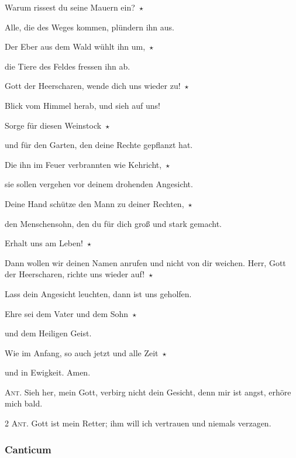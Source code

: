 \noindent Warum rissest du seine Mauern ein?~$\star$~\nopagebreak

Alle, die des Weges kommen, plündern ihn aus.

\noindent Der Eber aus dem Wald wühlt ihn um,~$\star$~\nopagebreak

die Tiere des Feldes fressen ihn ab.

\noindent Gott der Heerscharen, wende dich uns wieder zu!~$\star$~\nopagebreak

Blick vom Himmel herab, und sieh auf uns!

\noindent Sorge für diesen Weinstock~$\star$~\nopagebreak

und für den Garten, den deine Rechte gepflanzt hat.

\noindent Die ihn im Feuer verbrannten wie Kehricht,~$\star$~\nopagebreak

sie sollen vergehen vor deinem drohenden Angesicht.

\noindent Deine Hand schütze den Mann zu deiner Rechten,~$\star$~\nopagebreak

den Menschensohn, den du für dich groß und stark gemacht.

\noindent Erhalt uns am Leben!~$\star$~\nopagebreak

Dann wollen wir deinen Namen anrufen und nicht von dir weichen. Herr, Gott der Heerscharen, richte uns wieder auf!~$\star$~\nopagebreak

Lass dein Angesicht leuchten, dann ist uns geholfen.

\noindent Ehre sei dem Vater und dem Sohn~$\star$~\nopagebreak

und dem Heiligen Geist.

\noindent Wie im Anfang, so auch jetzt und alle Zeit~$\star$~\nopagebreak

und in Ewigkeit. Amen.

\vspace{10pt}

\noindent \textsc{Ant.} Sieh her, mein Gott, verbirg nicht dein Gesicht, denn mir ist angst, erhöre mich bald. 

\vspace{10pt}

\noindent \textsc{2 Ant.} Gott ist mein Retter; ihm will ich vertrauen und niemals verzagen. \nopagebreak

\subsubsection{Canticum}

